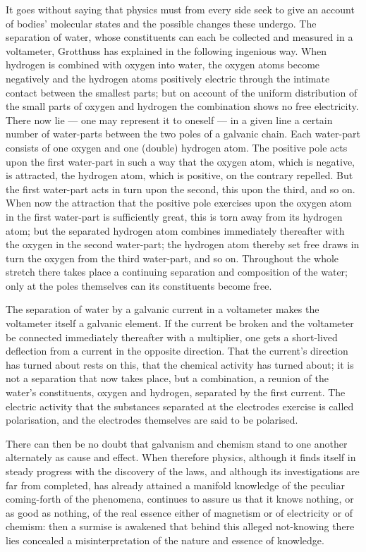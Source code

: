 \documentclass[12pt,a4paper]{book}
\begin{document}
It goes without saying that physics must from every side seek to give an account of bodies' molecular states and the
possible changes these undergo. The separation of water, whose constituents can each be collected and measured in a
voltameter, Grotthuss has explained in the following ingenious way. When hydrogen is combined with oxygen into water, the
oxygen atoms become negatively and the hydrogen atoms positively electric through the intimate contact between the
smallest parts; but on account of the uniform distribution of the small parts of oxygen and hydrogen the combination
shows no free electricity. There now lie --- one may represent it to oneself --- in a given line a certain number of
water-parts between the two poles of a galvanic chain. Each water-part consists of one oxygen and one (double) hydrogen
atom. The positive pole acts upon the first water-part in such a way that the oxygen atom, which is negative, is
attracted, the hydrogen atom, which is positive, on the contrary repelled. But the first water-part acts in turn upon the
second, this upon the third, and so on. When now the attraction that the positive pole exercises upon the oxygen atom in
the first water-part is sufficiently great, this is torn away from its hydrogen atom; but the separated hydrogen atom
combines immediately thereafter with the oxygen in the second water-part; the hydrogen atom thereby set free draws in
turn the oxygen from the third water-part, and so on. Throughout the whole stretch there takes place a continuing
separation and composition of the water; only at the poles themselves can its constituents become free.

The separation of water by a galvanic current in a voltameter makes the voltameter itself a galvanic element.
If the current be broken and the voltameter be connected immediately thereafter with a multiplier, one gets a short-lived
deflection from a current in the opposite direction. That the current's direction has turned about rests on this, that
the chemical activity has turned about; it is not a separation that now takes place, but a combination, a reunion of the
water's constituents, oxygen and hydrogen, separated by the first current. The electric activity that the substances
separated at the electrodes exercise is called polarisation, and the electrodes themselves are said to be polarised.

There can then be no doubt that galvanism and chemism stand to one another alternately as cause and effect. When
therefore physics, although it finds itself in steady progress with the discovery of the laws, and although its
investigations are far from completed, has already attained a manifold knowledge of the peculiar coming-forth of the
phenomena, continues to assure us that it knows nothing, or as good as nothing, of the real essence either of magnetism
or of electricity or of chemism: then a surmise is awakened that behind this alleged not-knowing there lies concealed a
misinterpretation of the nature and essence of knowledge.
\end{document}
